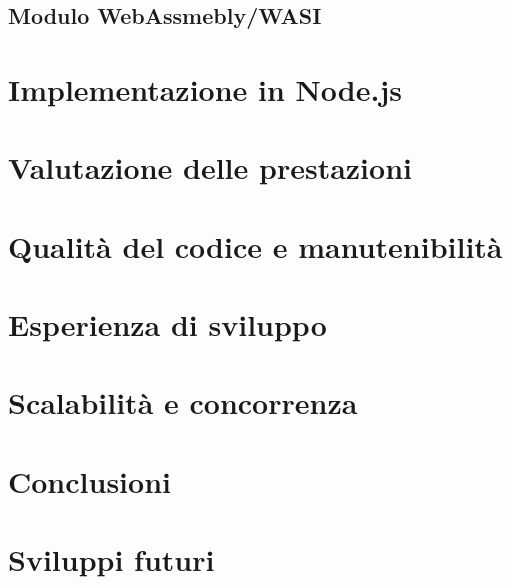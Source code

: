 \subsection{Modulo WebAssmebly/WASI}

\newpage
\section{Implementazione in Node.js}

\section{Valutazione delle prestazioni}
\section{Qualità del codice e manutenibilità}
\section{Esperienza di sviluppo}
\section{Scalabilità e concorrenza}
\section{Conclusioni}
\section{Sviluppi futuri}